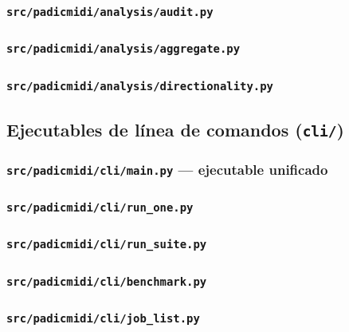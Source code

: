 \documentclass[11pt,a4paper,oneside]{article}
\theoremstyle{plain}
\theoremstyle{definition}
\theoremstyle{remark}
\newcommand{\code}[1]{\texttt{\small #1}}
\begin{document}
\subsubsection{\code{src/padicmidi/analysis/audit.py}}


\subsubsection{\code{src/padicmidi/analysis/aggregate.py}}


\subsubsection{\code{src/padicmidi/analysis/directionality.py}}


\subsection{Ejecutables de línea de comandos (\code{cli/})}

\subsubsection{\code{src/padicmidi/cli/main.py} --- ejecutable unificado}


\subsubsection{\code{src/padicmidi/cli/run\_one.py}}


\subsubsection{\code{src/padicmidi/cli/run\_suite.py}}


\subsubsection{\code{src/padicmidi/cli/benchmark.py}}


\subsubsection{\code{src/padicmidi/cli/job\_list.py}}

\end{document}

